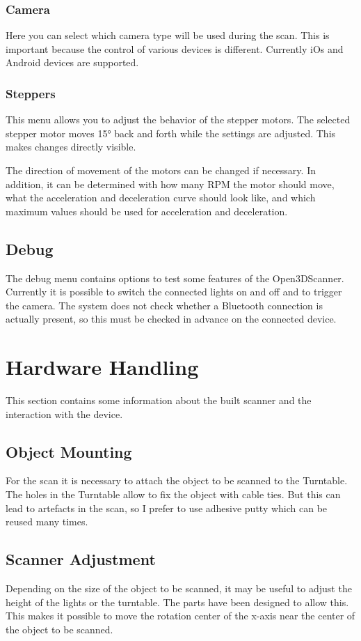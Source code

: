 \subsubsection{Camera}%
Here you can select which camera type will be used during the scan. This is important because the control of various devices is different. Currently iOs and Android devices are supported.%

\subsubsection{Steppers}%
This menu allows you to adjust the behavior of the stepper motors. The selected stepper motor moves 15° back and forth while the settings are adjusted. This makes changes directly visible.%

The direction of movement of the motors can be changed if necessary. In addition, it can be determined with how many RPM the motor should move, what the acceleration and deceleration curve should look like, and which maximum values should be used for acceleration and deceleration.%

\subsection{Debug}%
The debug menu contains options to test some features of the Open3DScanner. Currently it is possible to switch the connected lights on and off and to trigger the camera. The system does not check whether a Bluetooth connection is actually present, so this must be checked in advance on the connected device.%

\section{Hardware Handling}%
This section contains some information about the built scanner and the interaction with the device.%

\subsection{Object Mounting}%
For the scan it is necessary to attach the object to be scanned to the Turntable. The holes in the Turntable allow to fix the object with cable ties. But this can lead to artefacts in the scan, so I prefer to use adhesive putty which can be reused many times.%

\subsection{Scanner Adjustment}%
Depending on the size of the object to be scanned, it may be useful to adjust the height of the lights or the turntable. The parts have been designed to allow this. This makes it possible to move the rotation center of the x-axis near the center of the object to be scanned.%

